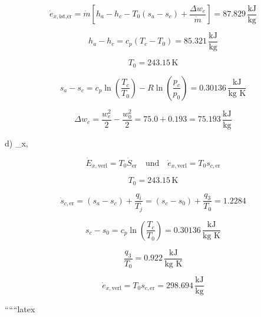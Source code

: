 \[
\dot{e}_{x, \text{ist,er}} = \dot{m} \left[ h_a - h_c - T_0 (s_a - s_c) + \frac{\Delta w_e}{\dot{m}} \right] = 87.829 \, \frac{\text{kJ}}{\text{kg}}
\]

\[
h_a - h_c = c_p (T_c - T_0) = 85.321 \, \frac{\text{kJ}}{\text{kg}}
\]

\[
T_0 = 243.15 \, \text{K}
\]

\[
s_a - s_c = c_p \ln \left( \frac{T_c}{T_0} \right) - R \ln \left( \frac{p_c}{p_0} \right) = 0.30136 \, \frac{\text{kJ}}{\text{kg K}}
\]

\[
\Delta w_e = \frac{w_e^2}{2} - \frac{w_0^2}{2} = 75.0 + 0.193 = 75.193 \, \frac{\text{kJ}}{\text{kg}}
\]

d) \quad {}_{x, }

\[
\dot{E}_{x, \text{verl}} = T_0 \dot{S}_{\text{er}} \quad \text{und} \quad \dot{e}_{x, \text{verl}} = T_0 s_{c, \text{er}}
\]

\[
T_0 = 243.15 \, \text{K}
\]

\[
\dot{s}_{c, \text{er}} = (s_a - s_c) + \frac{q_i}{T_j} = (s_c - s_0) + \frac{q_3}{T_0} = 1.2284
\]

\[
s_c - s_0 = c_p \ln \left( \frac{T_c}{T_0} \right) = 0.30136 \, \frac{\text{kJ}}{\text{kg K}}
\]

\[
\frac{q_3}{T_0} = 0.922 \, \frac{\text{kJ}}{\text{kg K}}
\]

\[
\dot{e}_{x, \text{verl}} = T_0 s_{c, \text{er}} = 298.694 \, \frac{\text{kJ}}{\text{kg}}
\]

``````latex


